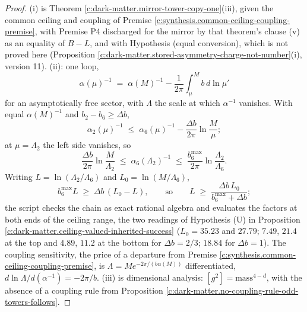 \documentclass[11pt]{article}
\theoremstyle{definition}
\theoremstyle{plain}
\begin{document}
\begin{proof}
(i) is Theorem \ref{c:dark-matter.mirror-tower-copy-one}(iii), given the common ceiling and coupling of Premise \ref{c:synthesis.common-ceiling-coupling-premise}, with Premise P4 discharged for the mirror by that theorem's clause (v) as an equality of $B - L$, and with Hypothesis (equal conversion), which is not proved here (Proposition \ref{c:dark-matter.stored-asymmetry-charge-not-number}(i), version 11). (ii): one loop,
\[
\alpha(\mu)^{-1} \;=\; \alpha(M)^{-1} - \frac{1}{2\pi}\int_{\mu}^{M} b\,d\ln\mu'
\]
for an asymptotically free sector, with $\Lambda$ the scale at which $\alpha^{-1}$ vanishes. With equal $\alpha(M)^{-1}$ and $b_{2} - b_{6} \geq \Delta b$,
\[
\alpha_{2}(\mu)^{-1} \;\leq\; \alpha_{6}(\mu)^{-1} - \frac{\Delta b}{2\pi}\ln\frac{M}{\mu};
\]
at $\mu = \Lambda_{2}$ the left side vanishes, so
\[
\frac{\Delta b}{2\pi}\ln\frac{M}{\Lambda_{2}} \;\leq\; \alpha_{6}(\Lambda_{2})^{-1} \;\leq\; \frac{b_{6}^{\max}}{2\pi}\ln\frac{\Lambda_{2}}{\Lambda_{6}}.
\]
Writing $L = \ln(\Lambda_{2}/\Lambda_{6})$ and $L_{0} = \ln(M/\Lambda_{6})$,
\[
b_{6}^{\max}L \;\geq\; \Delta b\,(L_{0} - L), \qquad\text{so}\qquad L \;\geq\; \frac{\Delta b\,L_{0}}{b_{6}^{\max} + \Delta b};
\]
the script checks the chain as exact rational algebra and evaluates the factors at both ends of the ceiling range, the two readings of Hypothesis (U) in Proposition \ref{c:dark-matter.ceiling-valued-inherited-success} ($L_{0} = 35.23$ and $27.79$; $7.49$, $21.4$ at the top and $4.89$, $11.2$ at the bottom for $\Delta b = 2/3$; $18.84$ for $\Delta b = 1$). The coupling sensitivity, the price of a departure from Premise \ref{c:synthesis.common-ceiling-coupling-premise}, is $\Lambda = M e^{-2\pi/(b\alpha(M))}$ differentiated, $d\ln\Lambda/d(\alpha^{-1}) = -2\pi/b$. (iii) is dimensional analysis: $[g^{2}] = \text{mass}^{4-d}$, with the absence of a coupling rule from Proposition \ref{c:dark-matter.no-coupling-rule-odd-towers-follows}.

\end{proof}
\end{document}
